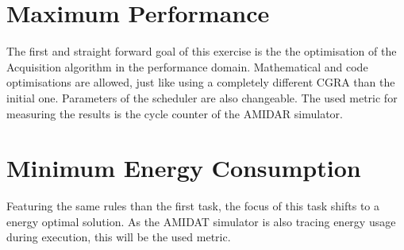 	\section{Maximum Performance} %
	\label{sec:task_max_perf}
		The first and straight forward goal of this exercise is the the optimisation of the Acquisition algorithm in the performance domain. Mathematical and code optimisations are allowed, just like using a completely different CGRA than the initial one. Parameters of the scheduler are also changeable.
		The used metric for measuring the results is the cycle counter of the AMIDAR simulator.

	\section{Minimum Energy Consumption} %
	\label{sec:task_min_energy}
		Featuring the same rules than the first task, the focus of this task shifts to a energy optimal solution. As the AMIDAT simulator is also tracing energy usage during execution, this will be the used metric.
